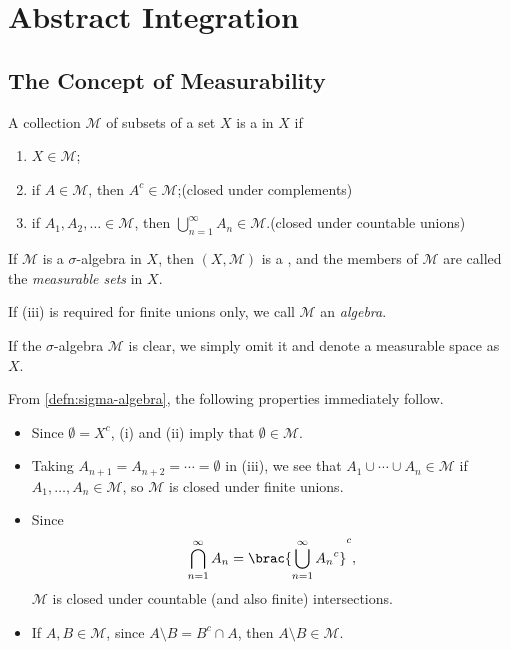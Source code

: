 \chapter{Abstract Integration}\label{chap:abstract-integration}
\section{The Concept of Measurability}
\begin{definition}\label{defn:sigma-algebra}
A collection $\mathcal{M}$ of subsets of a set $X$ is a  in $X$ if
\begin{enumerate}[label=(\roman*)]
\item $X\in\mathcal{M}$;
\item if $A\in\mathcal{M}$, then $A^c\in\mathcal{M}$;\hfill(closed under complements)
\item if $A_1,A_2,\dots\in\mathcal{M}$, then $\bigcup_{n=1}^{\infty}A_n\in\mathcal{M}$.\hfill(closed under countable unions)
\end{enumerate}
If $\mathcal{M}$ is a $\sigma$-algebra in $X$, then $(X,\mathcal{M})$ is a , and the members of $\mathcal{M}$ are called the \emph{measurable sets} in $X$.
\end{definition}

If (iii) is required for finite unions only, we call $\mathcal{M}$ an \emph{algebra}.

\begin{remark}
If the $\sigma$-algebra $\mathcal{M}$ is clear, we simply omit it and denote a measurable space as $X$.
\end{remark}

From \cref{defn:sigma-algebra}, the following properties immediately follow.
\begin{itemize}
\item Since $\emptyset=X^c$, (i) and (ii) imply that $\emptyset\in\mathcal{M}$.
\item Taking $A_{n+1}=A_{n+2}=\cdots=\emptyset$ in (iii), we see that $A_1\cup\cdots\cup A_n\in\mathcal{M}$ if $A_1,\dots,A_n\in\mathcal{M}$, so $\mathcal{M}$ is closed under finite unions.
\item Since
\[\bigcap_{n=1}^{\infty}A_n=\brac{\bigcup_{n=1}^{\infty}{A_n}^c}^c,\]
$\mathcal{M}$ is closed under countable (and also finite) intersections.
\item If $A,B\in\mathcal{M}$, since $A\setminus B=B^c\cap A$, then $A\setminus B\in\mathcal{M}$.
\end{itemize}


